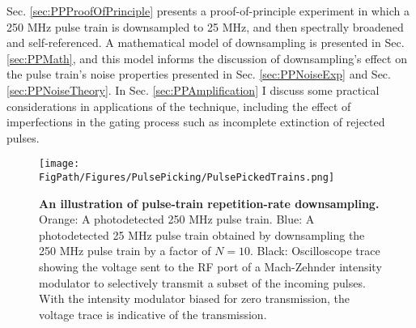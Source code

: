 Sec. \ref{sec:PPProofOfPrinciple} presents a proof-of-principle experiment in which a 250 MHz pulse train is downsampled to 25 MHz, and then spectrally broadened and self-referenced. A mathematical model of downsampling is presented in Sec. \ref{sec:PPMath}, and this model informs the discussion of downsampling's effect on the pulse train's noise properties presented in Sec. \ref{sec:PPNoiseExp} and Sec. \ref{sec:PPNoiseTheory}. In Sec. \ref{sec:PPAmplification} I discuss some practical considerations in applications of the technique, including the effect of imperfections in the gating process such as incomplete extinction of rejected pulses.



\begin{figure}[htpb]
	\begin{center}
		\texttt{[image: \\FigPath/Figures/PulsePicking/PulsePickedTrains.png]}
	\end{center}
	\caption[An illustration of pulse-train repetition-rate downsampling]{\textbf{An illustration of pulse-train repetition-rate downsampling.} Orange: A photodetected 250 MHz pulse train. Blue: A photodetected 25 MHz pulse train obtained by downsampling the 250 MHz pulse train by a factor of $N=10$. Black: Oscilloscope trace showing the voltage sent to the RF port of a Mach-Zehnder intensity modulator to selectively transmit a subset of the incoming pulses. With the intensity modulator biased for zero transmission, the voltage trace is indicative of the transmission.}
	\label{fig:PPConcept}
\end{figure} 





